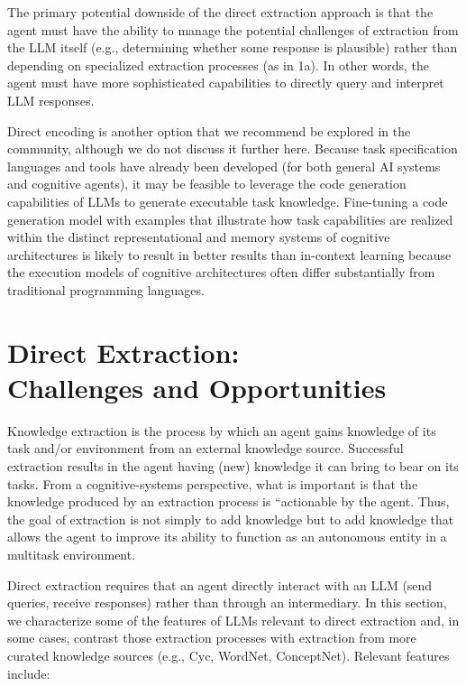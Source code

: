\documentclass[letterpaper]{article} %
\begin{document}
The primary potential downside of the direct extraction approach is that the agent must have the ability to manage the potential challenges of extraction from the LLM itself (e.g., determining whether some response is plausible) rather than depending on specialized extraction processes (as in 1a). In other words, the agent must have more sophisticated capabilities to directly query and interpret LLM responses.

Direct encoding is another option that we recommend be explored in the community, although we do not discuss it further here. Because task specification languages and tools have already been developed (for both general AI systems and cognitive agents), it may be feasible to leverage the code generation capabilities of LLMs to generate executable task knowledge. Fine-tuning a code generation model with examples that illustrate how task capabilities are realized within the distinct representational and memory systems of cognitive architectures is likely to result in better results than in-context learning because the execution models of cognitive architectures often differ substantially from traditional programming languages.



\section{Direct Extraction: \\ Challenges and Opportunities}

Knowledge extraction is the process by which an agent gains knowledge of its task and/or environment from an external knowledge source. Successful extraction results in the agent having (new) knowledge it can bring to bear on its tasks. From a cognitive-systems perspective, what is important is that the knowledge produced by an extraction process is ``actionable by the agent. Thus, the goal of extraction is not simply to add knowledge but to add knowledge that allows the agent to improve its ability to function as an autonomous entity in a multitask environment.

Direct extraction requires that an agent directly interact with an LLM (send queries, receive responses) rather than through an intermediary. In this section, we characterize some of the features of LLMs relevant to direct extraction and, in some cases, contrast those extraction processes with extraction from more curated knowledge sources (e.g., Cyc, WordNet, ConceptNet). Relevant features include:
\end{document}

